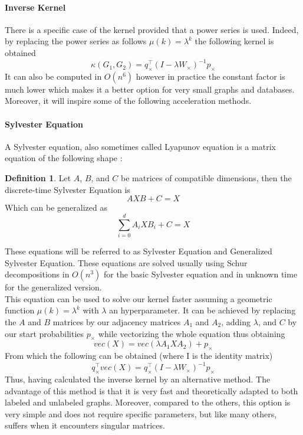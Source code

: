 \documentclass{article}
\theoremstyle{definition}
\newtheorem{definition}{Definition}
\begin{document}
\paragraph{Inverse Kernel}
There is a specific case of the kernel provided that a power series is used. Indeed, by replacing the power series as follows $\mu(k)=\lambda^k$ the following kernel is obtained 
\begin{equation}
	\kappa(G_1,G_2)=q_{\times}^{\top}(I-\lambda W_\times)^{-1}p_{\times}
\end{equation}
It can also be computed in $O(n^6)$ however in practice the constant factor is much lower which makes it a better option for very small graphs and databases. Moreover, it will inspire some of the following acceleration methods.
\paragraph{Sylvester Equation}
A Sylvester equation, also sometimes called Lyapunov equation is a matrix equation of the following shape :
\begin{definition}
	Let $A$, $B$, and $C$ be matrices of compatible dimensions, then the discrete-time Sylvester Equation is 
	\begin{equation}
	AXB+C=X
	\end{equation}
	Which can be generalized as
	\begin{equation}
		\sum_{i=0}^{d}A_{i}XB_{i}+C=X
	\end{equation}
\end{definition}
These equations will be referred to as Sylvester Equation and Generalized Sylvester Equation. These equations are solved usually using Schur decompositions in $O(n^3)$ for the basic Sylvester equation and in unknown time for the generalized version\cite{vishwanathan_graph_2010}.\\
This equation can be used to solve our kernel faster assuming a geometric function $\mu(k)=\lambda^k$ with $\lambda$ an hyperparameter. It can be achieved by replacing the $A$ and $B$ matrices by our adjacency matrices $A_1$ and $A_2$, adding $\lambda$, and $C$ by our start probabilities $p_\times$ while vectorizing the whole equation thus obtaining
\begin{equation}
	vec(X) = vec(\lambda A_{1}XA_{2}) + p_{\times}
\end{equation}
From which the following can be obtained (where I is the identity matrix)
\begin{equation}
	q_{\times}^{\top}vec(X)=q_{\times}^{\top}(I-\lambda W_{\times})^{-1}p_{\times}
\end{equation}
Thus, having calculated the inverse kernel by an alternative method. The advantage of this method is that it is very fast and theoretically adapted to both labeled and unlabeled graphs. Moreover, compared to the others, this option is very simple and does not require specific parameters, but like many others, suffers when it encounters singular matrices.  
\end{document}
